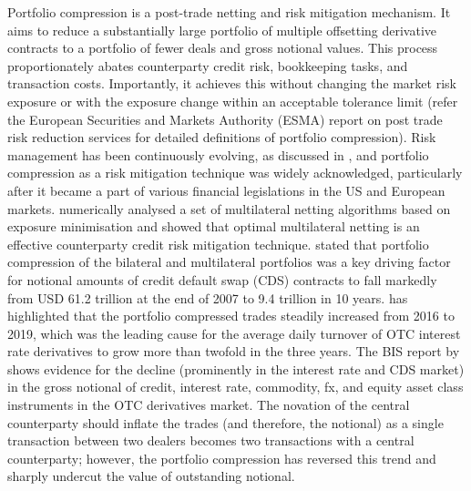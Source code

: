 Portfolio compression is a post-trade netting and risk mitigation mechanism. It aims to reduce a substantially large portfolio of multiple offsetting derivative contracts to a portfolio of fewer deals and gross notional values. This process proportionately abates counterparty credit risk, bookkeeping tasks, and transaction costs. Importantly, it achieves this without changing the market risk exposure or with the exposure change within an acceptable tolerance limit (refer the European Securities and Markets Authority (ESMA) report on post trade risk reduction services \cite{esma} for detailed definitions of portfolio compression). Risk management has been continuously evolving, as discussed in \cite{dionne2013risk}, and portfolio compression as a risk mitigation technique was widely acknowledged, particularly after it became a part of various financial legislations in the US and European markets. \cite{o2017optimising} numerically analysed a set of multilateral netting algorithms based on exposure minimisation and showed that optimal multilateral netting is an effective counterparty credit risk mitigation technique. \cite{aldasoro2018credit} stated that portfolio compression of the bilateral and multilateral portfolios was a key driving factor for notional amounts of credit default swap (CDS) contracts to fall markedly from USD 61.2 trillion at the end of 2007 to 9.4 trillion in 10 years. \cite{ehlers2019evolution} has highlighted that the portfolio compressed trades steadily increased from 2016 to 2019, which was the leading cause for the average daily turnover of OTC interest rate derivatives to grow more than twofold in the three years. The BIS report by \cite{schrimpf2015outstanding} shows evidence for the decline (prominently in the interest rate and CDS market) in the gross notional of credit, interest rate, commodity, fx, and equity asset class instruments in the OTC derivatives market. The novation of the central counterparty should inflate the trades (and therefore, the notional) as a single transaction between two dealers becomes two transactions with a central counterparty; however, the portfolio compression has reversed this trend and sharply undercut the value of outstanding notional. \\

